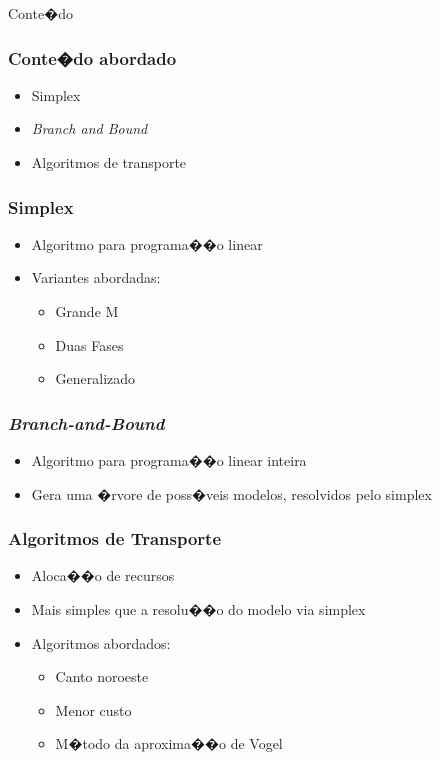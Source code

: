 \documentclass[handout]{beamer}
\begin{document}
\begin{section}{Conte�do}

\begin{frame}\frametitle{Conte�do abordado}
	\begin{itemize}
		\item Simplex
		\bigskip
		\item \textit{Branch and Bound}
		\bigskip
		\item Algoritmos de transporte
	\end{itemize}
\end{frame}

\begin{frame}\frametitle{Simplex}
	\begin{itemize}
		\item Algoritmo para programa��o linear
		\bigskip
		\item Variantes abordadas:
		\begin{itemize}
			\medskip
			\item Grande M
			\medskip
			\item Duas Fases
			\medskip
			\item Generalizado
		\end{itemize}
	\end{itemize}
\end{frame}

\begin{frame}\frametitle{\textit{Branch-and-Bound}}
	\begin{itemize}
		\item Algoritmo para programa��o linear inteira
		\bigskip
		\item Gera uma �rvore de poss�veis modelos, resolvidos pelo simplex
	\end{itemize}
\end{frame}

\begin{frame}\frametitle{Algoritmos de Transporte}
	\begin{itemize}
		\item Aloca��o de recursos
		\bigskip
		\item Mais simples que a resolu��o do modelo via simplex
		\bigskip
		\item Algoritmos abordados:
		\begin{itemize}
			\medskip
			\item Canto noroeste
			\medskip
			\item Menor custo
			\medskip
			\item M�todo da aproxima��o de Vogel
		\end{itemize}
	\end{itemize}
\end{frame}

\end{section}
\end{document}
